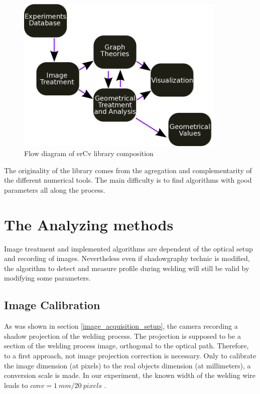 \documentclass[12pt]{iopart}
\begin{document}
\begin{figure}
\begin{center}
\includegraphics[width=10cm]{images/schema-erCv.png}
\caption{{\small Flow diagram of erCv library composition}}
\label{fig::schema-erCv}
\end{center}
\end{figure}

The originality of the library comes from the agregation 
and complementarity of the different numerical tools.
The main difficulty is to find algorithms with good parameters all along the process.



\section{ The Analyzing methods}
\label{ the_analyze_methods}
Image treatment and implemented algorithms are dependent of the optical setup and recording of images.
Nevertheless even if shadowgraphy technic is modified, the algorithm to detect and measure profile during
welding will still be valid by modifying some parameters.


\subsection{ Image Calibration}
\label{ image_calibration}

As was shown in section \ref{image_acquisition_setup}, the camera recording a 
shadow projection of the welding process. The projection is 
supposed to be a section of the welding process image, orthogonal to the optical path.
Therefore, to a first approach, not image projection 
correction is necessary. Only to calibrate the image dimension 
(at pixels) to the real objects dimension (at millimeters), a conversion scale is 
made. In our experiment, the known width of the welding wire leads to $conv = 1\ mm/ 20\ pixels$ . 
  
\end{document}
